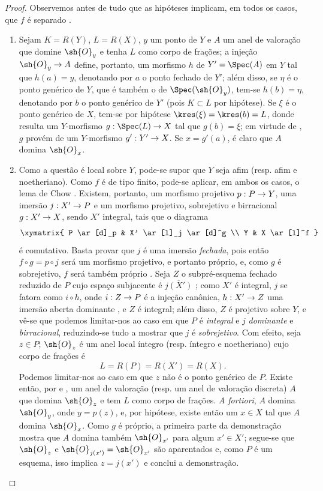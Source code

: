 \documentclass[oneside,10pt]{amsart}
\makeatletter
\newcommand{\ega@arrow}[2]{\mathchoice{#1}{#2}{#2}{#2}}
\renewcommand{\to}{\ega@arrow{\longrightarrow}{\rightarrow}}
\newcommand{\oldpage}[2][]{\marginnote{\normalfont\footnotesize\textbf{#1}~|~#2}\ignorespaces}
\makeatother
\begin{document}
\begin{proof}
Observemos antes de tudo que as hipóteses implicam, em todos os casos, que $f$ é separado .
\begin{enumerate}
  \item[\rm{(i)}] Sejam $K=R(Y)$, $L=R(X)$, $y$ um ponto de $Y$ e $A$ um anel de valoração que domine $\sh{O}_y$ e tenha $L$ como corpo de frações;
  a injeção $\sh{O}_y\to A$ define, portanto, um morfismo $h$ de $Y'=\Spec(A)$ em $Y$  tal que $h(a)=y$, denotando por $a$ o ponto fechado de $Y'$;
  além disso, se $\eta$ é o ponto genérico de $Y$, que é também o de $\Spec(\sh{O}_y)$, tem-se $h(b)=\eta$, denotando por $b$ o ponto genérico de $Y'$ (pois $K\subset L$ por hipótese).
  Se $\xi$ é o ponto genérico de $X$, tem-se por hipótese $\kres(\xi)=\kres(b)=L$, donde resulta um $Y$-morfismo $g:\Spec(L)\to X$ tal que $g(b)=\xi$;
  em virtude de , $g$ provém de um $Y$-morfismo $g':Y'\to X$.
  Se $x=g'(a)$, é claro que $A$ domina $\sh{O}_x$.

  \item[\rm{(ii)}] Como a questão é local sobre $Y$, pode-se supor que $Y$ seja afim (resp. afim e noetheriano).
  Como $f$ é de tipo finito, pode-se aplicar, em ambos os casos, o lema de Chow .
  Existem, portanto, um morfismo projetivo $p:P\to Y$, uma imersão $j:X'\to P$ e um morfismo projetivo, sobrejetivo e birracional $g:X'\to X$, sendo $X'$ integral, tais que o diagrama
  \[
    \xymatrix{
      P \ar[d]_p
      & X' \ar[l]_j \ar[d]^g
      \\ Y
      & X \ar[l]^f
    }
  \]
  é comutativo.
  Basta provar que $j$ é uma imersão \emph{fechada}, pois então $f\circ g=p\circ j$ será um morfismo projetivo, e portanto próprio, e, como $g$ é sobrejetivo, $f$ será também próprio .
  Seja $Z$ o subpré-esquema fechado reduzido de $P$ cujo espaço subjacente é $\overline{j(X')}$ ;
  como $X'$ é integral, $j$ se fatora como $i\circ h$, onde $i:Z\to P$ é a injeção canônica, $h:X'\to Z$ uma imersão aberta dominante , e $Z$ é integral;
\oldpage[II]{147}
  além disso, $Z$ é projetivo sobre $Y$, e vê-se que podemos limitar-nos ao caso em que $P$ é \emph{integral} e $j$ \emph{dominante} e \emph{birracional}, reduzindo-se tudo a mostrar que $j$ é \emph{sobrejetivo}.
  Com efeito, seja $z\in P$;
  $\sh{O}_z$ é um anel local íntegro (resp. íntegro e noetheriano) cujo corpo de frações é
  \[
    L=R(P)=R(X')=R(X).
  \]
  Podemos limitar-nos ao caso em que $z$ não é o ponto genérico de $P$.
  Existe então, por  e , um anel de valoração (resp. um anel de valoração discreta) $A$ que domina $\sh{O}_z$ e tem $L$ como corpo de frações.
  \emph{A fortiori}, $A$ domina $\sh{O}_y$, onde $y=p(z)$, e, por hipótese, existe então um $x\in X$ tal que $A$ domina $\sh{O}_x$.
  Como $g$ é próprio, a primeira parte da demonstração mostra que $A$ domina também $\sh{O}_{x'}$ para algum $x'\in X'$;
  segue-se que $\sh{O}_z$ e $\sh{O}_{j(x')}=\sh{O}_{x'}$ são aparentados  e, como $P$ é um esquema, isso implica $z=j(x')$  e conclui a demonstração.
\end{enumerate}
\end{proof}
\end{document}
